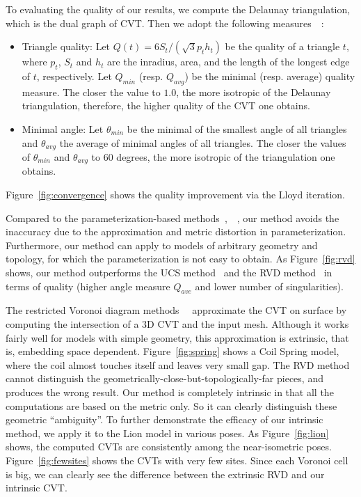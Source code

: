 To evaluating the quality of our results, we compute the Delaunay triangulation, which is the dual graph of CVT.
Then we adopt the following measures~\cite{frey1997surface}~\cite{DBLP:journals/cgf/YanLLSW09}:
\begin{itemize}
\item Triangle quality: Let $Q(t) = 6S_t/(\sqrt{3}p_th_t)$ be the quality of a triangle $t$, where  $p_t$, $S_t$ and $h_t$ are the inradius, area, and the length of the longest edge of $t$, respectively. Let $Q_{min}$ (resp. $Q_{avg}$) be the minimal (resp. average) quality measure. The closer the value to $1.0$, the more isotropic of the Delaunay triangulation, therefore, the higher quality of the CVT one obtains.
\item Minimal angle: Let $\theta_{min}$ be the minimal of the smallest angle of all triangles and $\theta_{avg}$ the average of minimal angles of all triangles.
The closer the values of $\theta_{min}$ and $\theta_{avg}$ to $60$
degrees, the more isotropic of the triangulation one obtains.
\end{itemize}
Figure~\ref{fig:convergence} shows the quality improvement via the Lloyd iteration.

Compared to the parameterization-based
methods~\cite{DBLP:journals/cvgip/AlliezVDI05},~\cite{Rong:2011:CVT}~\cite{Rong_Etc:2011},
our method avoids the inaccuracy due to the approximation and metric
distortion in parameterization. Furthermore, our method can apply to
models of arbitrary geometry and topology, for which the
parameterization is not easy to obtain. As Figure~\ref{fig:rvd}
shows, our method outperforms the UCS method~\cite{Rong:2011:CVT}
and the RVD method~\cite{DBLP:journals/cgf/YanLLSW09} in terms of
quality (higher angle measure $Q_{ave}$ and lower number of
singularities).

The restricted Voronoi diagram
methods~\cite{DBLP:journals/cgf/YanLLSW09}~\cite{DBLP:conf/gmp/YanWLL10}
approximate the CVT on surface by computing the intersection of a 3D
CVT and the input mesh. Although it works fairly well for models
with simple geometry, this approximation is extrinsic, that is,
embedding space dependent. Figure~\ref{fig:spring} shows a Coil
Spring model, where the coil almost touches itself and leaves very
small gap. The RVD method cannot distinguish the
geometrically-close-but-topologically-far pieces, and produces the
wrong result. Our method is completely intrinsic in that all the
computations are based on the metric only. So it can clearly
distinguish these geometric ``ambiguity''. To further demonstrate
the efficacy of our intrinsic method, we apply it to the Lion model
in various poses. As Figure~\ref{fig:lion} shows, the computed CVTs
are consistently among the near-isometric poses.
Figure~\ref{fig:fewsites} shows the CVTs with very few sites. Since
each Voronoi cell is big, we can clearly see the difference between
the extrinsic RVD and our intrinsic CVT.


